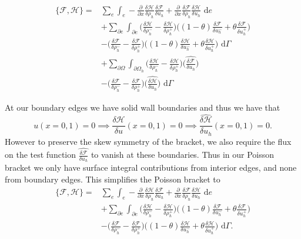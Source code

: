 \documentclass[a4paper,11pt]{article}
\begin{document}
 \begin{equation}
\begin{aligned}
 \{ \mathcal{F},  \mathcal{H}\} = & \sum_e \int_e - \frac{\partial}{\partial x}\frac{\delta  \mathcal{H}}{\delta \rho_h} \frac{\delta  \mathcal{F}}{\delta u_h} + \frac{\partial}{\partial x}\frac{\delta  \mathcal{F}}{\delta \rho_h} \frac{\delta  \mathcal{H}}{\delta u_h} \text{ d}e \\
 &+ \sum_{\partial e} \int_{\partial e } \bigg(  \frac{\delta  \mathcal{H}}{\delta \rho_h^-} -\frac{\delta  \mathcal{H}}{\delta \rho_h^+}\bigg)\bigg ( (1-\theta) \frac{\delta  \mathcal{F}}{\delta u_h^-}+ \theta\frac{\delta  \mathcal{F}}{\delta u_h^+} \bigg)\\
 & - \bigg(  \frac{\delta  \mathcal{F}}{\delta \rho_h^-} -\frac{\delta  \mathcal{F}}{\delta \rho_h^+}\bigg)\bigg ( (1-\theta) \frac{\delta  \mathcal{H}}{\delta u_h^-}+ \theta\frac{\delta  \mathcal{H}}{\delta u_h^+} \bigg) \text{ d} \Gamma \\
 &+ \sum_{\partial \Omega} \int_{\partial \Omega_h } \bigg(  \frac{\delta  \mathcal{H}}{\delta \rho_h^-} -\frac{\delta  \mathcal{H}}{\delta \rho_h^+}\bigg)\bigg (   \widehat{\frac{\delta  \mathcal{F}}{\delta u_h}} \bigg)\\
 & - \bigg(  \frac{\delta  \mathcal{F}}{\delta \rho_h^-} -\frac{\delta  \mathcal{F}}{\delta \rho_h^+}\bigg)\bigg (   \widehat{\frac{\delta  \mathcal{H}}{\delta u_h}} \bigg) \text{ d}  \Gamma
 \end{aligned}
 \end{equation}
 
 At our boundary edges we have solid wall boundaries and thus we have that 
\[ u(x = 0, 1) = 0 \implies   \frac{\delta  \mathcal{H}}{\delta u}(x=0,1) = 0 \implies   \widehat{\frac{\delta  \mathcal{H}}{\delta u_h}}(x=0,1) = 0.\]
However to preserve the skew symmetry of the bracket, we also require the flux on the test function $  \widehat{\frac{\delta  \mathcal{F}}{\delta u_h}}$ to vanish at these boundaries. Thus in our Poisson bracket we only have surface integral contributions from interior edges, and none from boundary edges.
 This simplifies the Poisson bracket to 
 \begin{equation}\label{eqns:discretepb}
\begin{aligned}
 \{ \mathcal{F},  \mathcal{H}\} = & \sum_e \int_e - \frac{\partial}{\partial x}\frac{\delta  \mathcal{H}}{\delta \rho_h} \frac{\delta  \mathcal{F}}{\delta u_h} + \frac{\partial}{\partial x}\frac{\delta  \mathcal{F}}{\delta \rho_h} \frac{\delta  \mathcal{H}}{\delta u_h} \text{ d}e \\
 &+ \sum_{\partial e}\int_{\partial e } \bigg(  \frac{\delta  \mathcal{H}}{\delta \rho_h^-} -\frac{\delta  \mathcal{H}}{\delta \rho_h^+}\bigg)\bigg ( (1-\theta) \frac{\delta  \mathcal{F}}{\delta u_h^-}+ \theta\frac{\delta  \mathcal{F}}{\delta u_h^+} \bigg)\\
 & - \bigg(  \frac{\delta  \mathcal{F}}{\delta \rho_h^-} -\frac{\delta  \mathcal{F}}{\delta \rho_h^+}\bigg)\bigg ( (1-\theta) \frac{\delta  \mathcal{H}}{\delta u_h^-}+ \theta\frac{\delta  \mathcal{H}}{\delta u_h^+} \bigg) \text{ d} \Gamma.
 \end{aligned}
 \end{equation}
\end{document}
